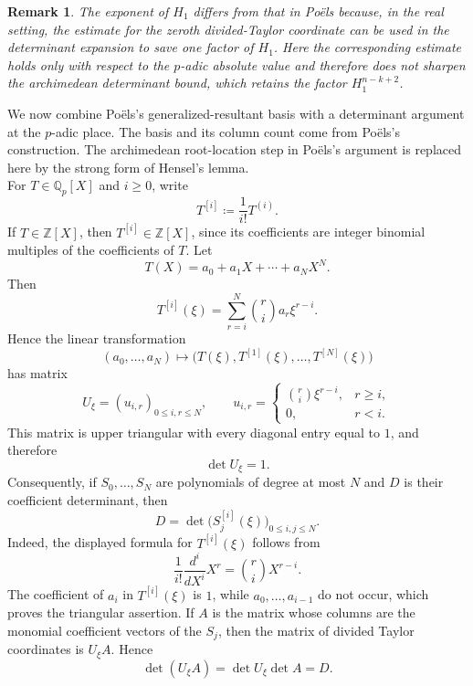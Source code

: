 \documentclass[10pt,a4paper]{amsart}
\newtheorem{remark}[theorem]{Remark}
\newcommand{\Z}{\mathbb Z}
\newcommand{\Qp}{\mathbb Q_p}
\begin{document}
\begin{remark}\label{rem:raw-determinant}
The exponent of $H_1$ differs from that in Po\"els
\cite[proof of Proposition~5.1]{PoelsWirsing} because, in the real setting,
the estimate for the zeroth divided-Taylor coordinate can be used in the
determinant expansion to save one factor of $H_1$. Here the corresponding
estimate holds only with respect to the $p$-adic absolute value and therefore
does not sharpen the archimedean determinant bound, which retains the factor
$H_1^{n-k+2}$.
\end{remark}


We now combine Po\"els's \cite[proof of Proposition~5.1]{PoelsWirsing}
generalized-resultant basis with a determinant argument at the $p$-adic
place. The basis and its column count come from Po\"els's
\cite[proof of Proposition~5.1]{PoelsWirsing} construction. The archimedean
root-location step in Po\"els's argument is replaced here by the strong form
of Hensel's lemma.\\

For $T\in\Qp[X]$ and $i\geq0$, write
$$
T^{[i]}\coloneqq\frac{1}{i!}T^{(i)}.
$$
If $T\in\Z[X]$, then $T^{[i]}\in\Z[X]$, since its coefficients are integer binomial multiples of the coefficients of $T$. Let
$$
T(X)=a_0+a_1X+\cdots+a_NX^N.
$$
Then
$$
T^{[i]}(\xi)
=
\sum_{r=i}^N\binom{r}{i}a_r\xi^{r-i}.
$$
Hence the linear transformation
$$
(a_0,\ldots,a_N)
\longmapsto
\bigl(T(\xi),T^{[1]}(\xi),\ldots,T^{[N]}(\xi)\bigr)
$$
has matrix
$$
U_\xi
=
\left(u_{i,r}\right)_{0\leq i,r\leq N},
\qquad
u_{i,r}
=
\begin{cases}
\binom{r}{i}\xi^{r-i},&r\geq i,\\
0,&r<i.
\end{cases}
$$
This matrix is upper triangular with every diagonal entry equal to $1$, and therefore
$$
\det U_\xi=1.
$$
Consequently, if $S_0,\ldots,S_N$ are polynomials of degree at most $N$ and $D$ is their coefficient determinant, then
$$
D
=
\det\bigl(S_j^{[i]}(\xi)\bigr)_{0\leq i,j\leq N}.
$$
Indeed, the displayed formula for $T^{[i]}(\xi)$ follows from
$$
\frac{1}{i!}\frac{d^i}{dX^i}X^r
=
\binom{r}{i}X^{r-i}.
$$
The coefficient of $a_i$ in $T^{[i]}(\xi)$ is $1$, while $a_0,\ldots,a_{i-1}$ do not occur, which proves the triangular assertion. If $A$ is the matrix whose columns are the monomial coefficient vectors of the $S_j$, then the matrix of divided Taylor coordinates is $U_\xi A$. Hence
$$
\det(U_\xi A)=\det U_\xi\det A=D.
$$
\end{document}

